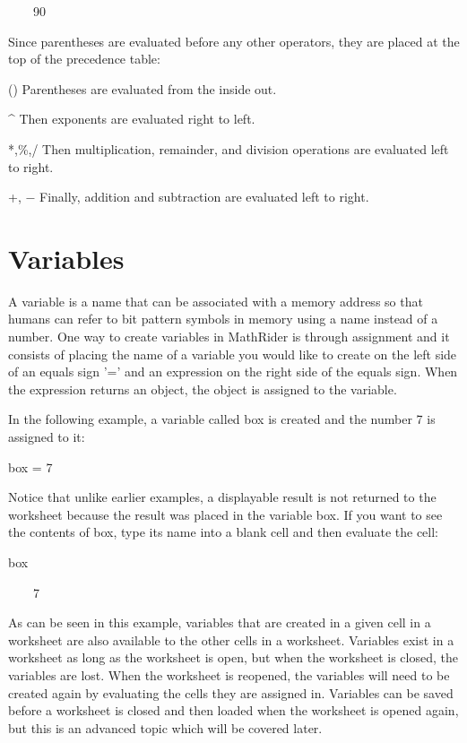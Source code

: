 \documentclass[12pt,oneside]{book}
\begin{document}
{\textbar}

\ \ \ \ 90


Since parentheses are evaluated before any other operators, they are placed at the top of the precedence table: 

() Parentheses are evaluated from the inside out.


\^{} Then exponents are evaluated right to left.


*,\%,/ Then multiplication, remainder, and division operations are evaluated left to right. 

+, $-$ Finally, addition and subtraction are evaluated left to right.

\section[Variables]{Variables}

A variable is a name that can be associated with a memory address so that humans can refer to bit pattern symbols in memory using a name instead of a number. One way to create variables in MathRider is through assignment and it consists of placing the name of a variable you would like to create on the left side of an equals sign '=' and an expression on the right side of the equals sign. When the expression returns an object, the object is assigned to the variable.

In the following example, a variable called box is created and the number 7 is assigned to it: 

box = 7

{\textbar}


Notice that unlike earlier examples, a displayable result is not returned to the worksheet because the result was placed in the variable box. If you want to see the contents of box, type its name into a blank cell and then evaluate the cell: 

box

{\textbar}

\ \ \ \ 7


As can be seen in this example, variables that are created in a given cell in a worksheet are also available to the other cells in a worksheet. Variables exist in a worksheet as long as the worksheet is open, but when the worksheet is closed, the variables are lost. When the worksheet is reopened, the variables will need to be created again by evaluating the cells they are assigned in. Variables can be saved before a worksheet is closed and then loaded when the worksheet is opened again, but this is an advanced topic which will be covered later. 
\end{document}

